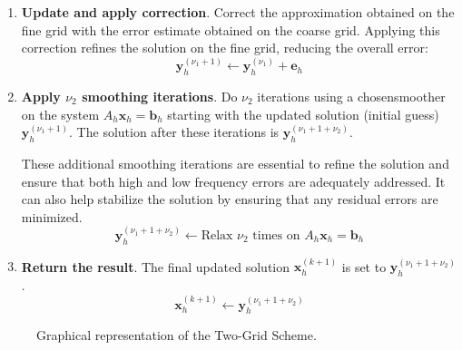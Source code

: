 \begin{enumerate}
    \item \textbf{Update and apply correction}. Correct the approximation obtained on the fine grid with the error estimate obtained on the coarse grid. Applying this correction refines the solution on the fine grid, reducing the overall error:
    \begin{equation*}
        \mathbf{y}_{h}^{\left(\nu_{1}+1\right)} \leftarrow \mathbf{y}_{h}^{\left(\nu_{1}\right)} + \mathbf{e}_{h}
    \end{equation*}

    \item \textbf{Apply $\nu_{2}$ smoothing iterations}. Do $\nu_{2}$ iterations using a chosen\break smoother on the system $A_{h}\mathbf{x}_{h} = \mathbf{b}_{h}$ starting with the updated solution (initial guess) $\mathbf{y}_{h}^{\left(\nu_{1}+1\right)}$. The solution after these iterations is $\mathbf{y}_{h}^{\left(\nu_{1}+1+\nu_{2}\right)}$.
    
    These additional smoothing iterations are essential to refine the solution and ensure that both high and low frequency errors are adequately addressed. It can also help stabilize the solution by ensuring that any residual errors are minimized.
    \begin{equation*}
        \mathbf{y}_{h}^{\left(\nu_{1} + 1 + \nu_{2}\right)} \leftarrow \text{Relax } \nu_{2} \text{ times on } A_{h}\mathbf{x}_{h} = \mathbf{b}_{h}
    \end{equation*}

    \item \textbf{Return the result}. The final updated solution $\mathbf{x}_{h}^{\left(k+1\right)}$ is set to $\mathbf{y}_{h}^{\left(\nu_{1} + 1 + \nu_{2}\right)}$.
    \begin{equation*}
        \mathbf{x}_{h}^{\left(k+1\right)} \leftarrow \mathbf{y}_{h}^{\left(\nu_{1} + 1 + \nu_{2}\right)}
    \end{equation*}
\end{enumerate}

\begin{figure}[!htp]
    \centering
    \resizebox{\textwidth}{!}{}
    \caption{Graphical representation of the Two-Grid Scheme.}
\end{figure}